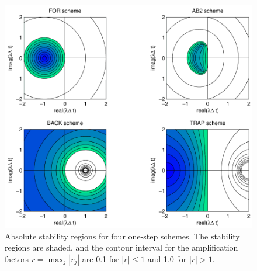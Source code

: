 \documentclass[12pt]{article}
\newcommand{\mycaption}[1]{\Mycaption{5.5in}{#1}}
\newcommand{\Mycaption}[2]{\parbox[t]{#1}{\caption{#2}}}
\begin{document}
\begin{figure}[tb]
\begin{center}
\includegraphics[width=5.5in,clip]{plot4}
\mycaption{\label{fig:plot4}
Absolute stability regions for four one-step schemes.  The stability regions 
are shaded, and the contour interval for the amplification factors
$r=\max_j|r_j|$ are 0.1 for $|r|\le1$ and 1.0 for $|r|>1$.}
\end{center}
\end{figure}
\end{document}
